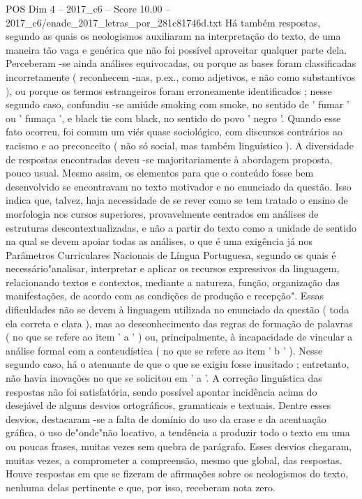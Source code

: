 \begin{textsample}{POS Dim 4 – 2017\_c6 – Score 10.00 – 2017\_c6/enade\_2017\_letras\_por\_281c81746d.txt}
Há também respostas, segundo as quais os neologismos auxiliaram na interpretação do texto, de uma maneira tão vaga e genérica que não foi possível aproveitar qualquer parte dela.
Perceberam -se ainda análises equivocadas, ou porque as bases foram classificadas incorretamente ( reconhecem -nas, p.ex., como adjetivos, e não como substantivos ), ou porque os termos estrangeiros foram erroneamente identificados ; nesse segundo caso, confundiu -se amiúde smoking com smoke, no sentido de ' fumar ' ou ' fumaça ', e black tie com black, no sentido do povo ' negro '.
Quando esse fato ocorreu, foi comum um viés quase sociológico, com discursos contrários ao racismo e ao preconceito ( não só social, mas também linguístico ).
A diversidade de respostas encontradas deveu -se majoritariamente à abordagem proposta, pouco usual.
Mesmo assim, os elementos para que o conteúdo fosse bem desenvolvido se encontravam no texto motivador e no enunciado da questão.
Isso indica que, talvez, haja necessidade de se rever como se tem tratado o ensino de morfologia nos cursos superiores, provavelmente centrados em análises de estruturas descontextualizadas, e não a partir do texto como a unidade de sentido na qual se devem apoiar todas as análises, o que é uma exigência já nos Parâmetros Curriculares Nacionais de Língua Portuguesa, segundo os quais é necessário"analisar, interpretar e aplicar os recursos expressivos da linguagem, relacionando textos e contextos, mediante a natureza, função, organização das manifestações, de acordo com as condições de produção e recepção".
Essas dificuldades não se devem à linguagem utilizada no enunciado da questão ( toda ela correta e clara ), mas ao desconhecimento das regras de formação de palavras ( no que se refere ao item ' a ' ) ou, principalmente, à incapacidade de vincular a análise formal com a conteudística ( no que se refere ao item ' b ' ).
Nesse segundo caso, há o atenuante de que o que se exigiu fosse inusitado ; entretanto, não havia inovações no que se solicitou em ' a '.
A correção linguística das respostas não foi satisfatória, sendo possível apontar incidência acima do desejável de alguns desvios ortográficos, gramaticais e textuais.
Dentre esses desvios, destacaram -se a falta de domínio do uso da crase e da acentuação gráfica, o uso de"onde"não locativo, a tendência a produzir todo o texto em uma ou poucas frases, muitas vezes sem quebra de parágrafo.
Esses desvios chegaram, muitas vezes, a comprometer a compreensão, mesmo que global, das respostas.
Houve respostas em que se fizeram de afirmações sobre os neologismos do texto, nenhuma delas pertinente e que, por isso, receberam nota zero.

\end{textsample}
